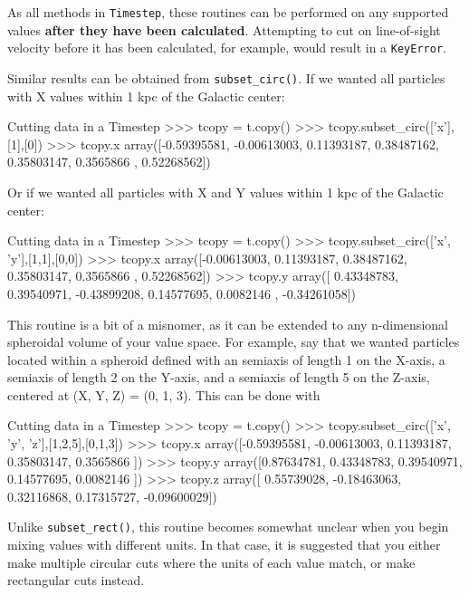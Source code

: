 \documentclass{article}
\begin{document}
As all methods in \verb!Timestep!, these routines can be performed on any supported values \textbf{after they have been calculated}. Attempting to cut on line-of-sight velocity before it has been calculated, for example, would result in a \verb!KeyError!. 

Similar results can be obtained from \verb!subset_circ()!. If we wanted all particles with X values within 1 kpc of the Galactic center: \\

\begin{codelisting}{Cutting data in a Timestep}
>>> tcopy = t.copy()
>>> tcopy.subset_circ(['x'],[1],[0])
>>> tcopy.x
array([-0.59395581, -0.00613003,  0.11393187,  0.38487162,  0.35803147,
        0.3565866 ,  0.52268562])
\end{codelisting}

Or if we wanted all particles with X and Y values within 1 kpc of the Galactic center: \\

\begin{codelisting}{Cutting data in a Timestep}
>>> tcopy = t.copy()
>>> tcopy.subset_circ(['x', 'y'],[1,1],[0,0])
>>> tcopy.x
array([-0.00613003,  0.11393187,  0.38487162,  0.35803147,  0.3565866 ,
        0.52268562])
>>> tcopy.y
array([ 0.43348783,  0.39540971, -0.43899208,  0.14577695,  0.0082146 ,
       -0.34261058])
\end{codelisting}

This routine is a bit of a misnomer, as it can be extended to any n-dimensional spheroidal volume of your value space. For example, say that we wanted particles located within a spheroid defined with an semiaxis of length 1 on the X-axis, a semiaxis of length 2 on the Y-axis, and a semiaxis of length 5 on the Z-axis, centered at (X, Y, Z) = (0, 1, 3). This can be done with \\

\begin{codelisting}{Cutting data in a Timestep}
>>> tcopy = t.copy()
>>> tcopy.subset_circ(['x', 'y', 'z'],[1,2,5],[0,1,3])
>>> tcopy.x
array([-0.59395581, -0.00613003,  0.11393187,  0.35803147,  0.3565866 ])
>>> tcopy.y
array([0.87634781, 0.43348783, 0.39540971, 0.14577695, 0.0082146 ])
>>> tcopy.z
array([ 0.55739028, -0.18463063,  0.32116868,  0.17315727, -0.09600029])
\end{codelisting}

Unlike \verb!subset_rect()!, this routine becomes somewhat unclear when you begin mixing values with different units. In that case, it is suggested that you either make multiple circular cuts where the units of each value match, or make rectangular cuts instead.  
\end{document}
